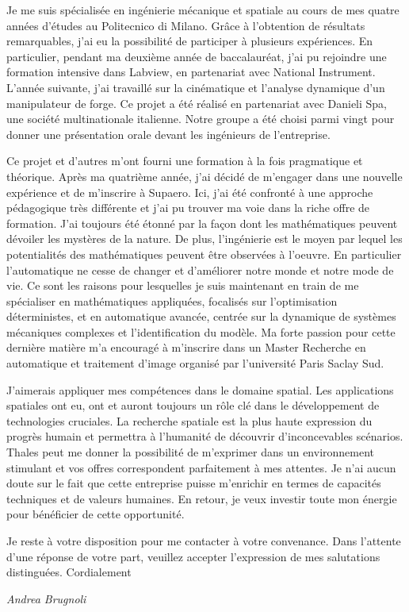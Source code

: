 \documentclass[11pt]{letter}
\begin{document}
Je me suis spécialisée en ingénierie mécanique et spatiale au cours de mes quatre années d'études au Politecnico di Milano. Grâce à l'obtention de résultats remarquables, j'ai eu la possibilité de participer à plusieurs expériences. En particulier, pendant ma deuxième année de baccalauréat, j'ai pu rejoindre une formation intensive dans Labview, en partenariat avec National Instrument. L'année suivante, j'ai travaillé sur la cinématique et l'analyse dynamique d'un manipulateur de forge. Ce projet a été réalisé en partenariat avec Danieli Spa, une société multinationale italienne. Notre groupe a été choisi parmi vingt pour donner une présentation orale devant les ingénieurs de l'entreprise.
\begin{comment}
J'ai spécialement apprécié de travailler sur un projet de transfert interplanétaire. Dans des missions spatiales complexes différentes disciplines doivent être intégrées et c'est la raison pour la quelle j'ai travaillé passionnément au projet. Plus tard, j'ai eu l'occasion de travailler sur la dynamique multi-corps dans l'environnement Simulink pour étudier les flexibilités des appendices au cours de manoeuvres de satellites.
\end{comment}
 Ce projet et d'autres m'ont fourni une formation à la fois pragmatique et théorique. Après ma quatrième année, j'ai décidé de m'engager dans une nouvelle expérience et de m'inscrire à Supaero. Ici, j'ai été confronté à une approche pédagogique très différente et j'ai pu trouver ma voie dans la riche offre de formation. J'ai toujours été étonné par la façon dont les mathématiques peuvent dévoiler les mystères de la nature. De plus, l'ingénierie est le moyen par lequel les potentialités des mathématiques peuvent être observées à l'oeuvre. En particulier l'automatique ne cesse de changer et d'améliorer notre monde et notre mode de vie. Ce sont les raisons pour lesquelles je suis maintenant en train de me spécialiser en mathématiques appliquées, focalisés sur l'optimisation déterministes,  et en automatique avancée, centrée sur la dynamique de systèmes mécaniques complexes et l'identification du modèle. Ma forte passion pour cette dernière matière m'a encouragé à m'inscrire dans un Master Recherche en automatique et traitement d'image organisé par l'université Paris Saclay Sud. 

J'aimerais appliquer mes compétences dans le domaine spatial. Les applications spatiales ont eu, ont et auront toujours un rôle clé dans le développement de technologies cruciales. La recherche spatiale est la plus haute expression du progrès humain et permettra à l'humanité de découvrir d'inconcevables scénarios.  Thales peut me donner la possibilité de m'exprimer dans un environnement stimulant et vos offres correspondent parfaitement à mes attentes. Je n'ai aucun doute sur le fait que cette entreprise puisse m'enrichir en termes de capacités techniques et de valeurs humaines. En retour, je veux investir toute mon énergie pour bénéficier de cette opportunité.

Je reste à votre disposition pour me contacter à votre convenance. Dans l'attente d'une réponse de votre part, veuillez accepter l'expression de mes salutations distinguées. Cordialement


 \begin{center}
 \large\textit{Andrea Brugnoli}
 \end{center}
 
\end{document}
